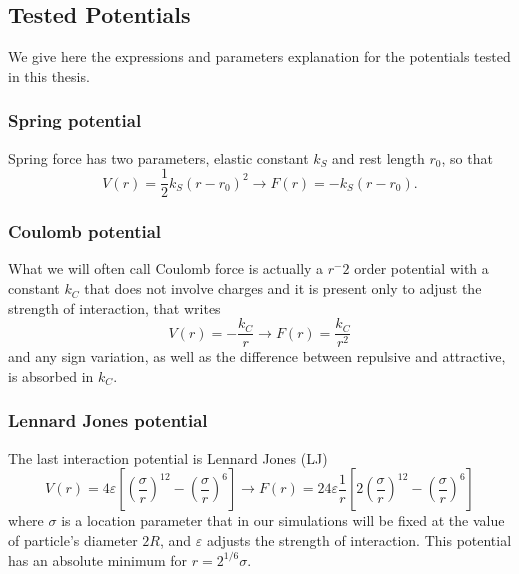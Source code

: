 \documentclass[../../master_thesis_np.tex]{subfiles}
\begin{document}
	\subsection{Tested Potentials}
			
	We give here the expressions and parameters explanation for the potentials tested in this thesis.
	
	\subsubsection{Spring potential}
	Spring force has two parameters, elastic constant $k_S$ and rest length $r_0$, so that 
	\begin{equation}
		V(r) = \frac{1}{2}k_S (r-r_0)^2 \rightarrow F(r) = -k_S(r-r_0).
	\end{equation}

	\subsubsection{Coulomb potential}
	What we will often call Coulomb force is actually a $r^-2$ order potential with a constant $k_C$ that does not involve charges and it is present only to adjust the strength of interaction, that writes
	\begin{equation}
		V(r) = -\frac{k_C}{r} \rightarrow F(r) = \frac{k_C}{r^2}
	\end{equation} 
	and any sign variation, as well as the difference between repulsive and attractive, is absorbed in $k_C$.

	\subsubsection{Lennard Jones potential}
	The last interaction potential is Lennard Jones (LJ)
	\begin{equation}
		V(r) = 4\varepsilon \left[ \left(\frac{\sigma}{r}\right)^{12} - \left(\frac{\sigma}{r}\right)^{6} \right] \rightarrow F(r) = 24\varepsilon \frac{1}{r}\left[ 2 \left(\frac{\sigma}{r}\right)^{12}  - \left(\frac{\sigma}{r}\right)^{6} \right]
	\end{equation}
	where $\sigma$ is a location parameter that in our simulations will be fixed at the value of particle's diameter $2R$, and $\varepsilon$ adjusts the strength of interaction. 
	This potential has an absolute minimum for $r = 2^{1/6}\sigma$.
	
\end{document}
